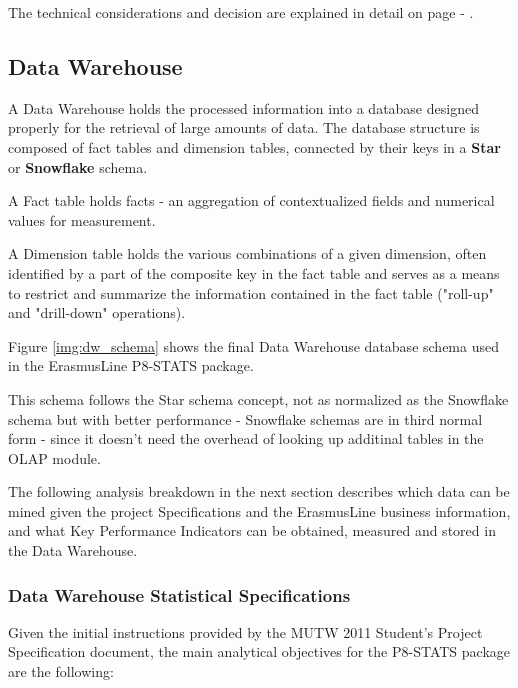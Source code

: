 The technical considerations and decision are explained in detail on page
\pageref{ssec:mysql_merge} - .


\newpage
\subsection{Data Warehouse}

A Data Warehouse holds the processed information into a database designed
properly for the retrieval of large amounts of data. The database structure is
composed of fact tables and dimension tables, connected by their keys in a
\textbf{Star} or \textbf{Snowflake} schema\cite{dwtk}.

A Fact table holds facts - an aggregation of contextualized fields and numerical
values for measurement\cite{dwtk}.

A Dimension table holds the various combinations of a given dimension, often
identified by a part of the composite key in the fact table and serves as a
means to restrict and summarize the information contained in the fact table
("roll-up" and "drill-down" operations)\cite{dwtk}.

Figure \ref{img:dw_schema} shows the final Data Warehouse database schema used
in the ErasmusLine P8-STATS package.

This schema follows the Star schema concept, not as normalized as the Snowflake
schema but with better performance\cite{dwtk} - Snowflake schemas are in third
normal form - since it doesn't need the overhead of looking up additinal tables
in the OLAP module.

The following analysis breakdown in the next section describes which data can be
mined given the project Specifications and the ErasmusLine business information,
and what Key Performance Indicators can be obtained, measured and stored in the
Data Warehouse.

\newpage
{}
\newpage

\subsubsection{Data Warehouse Statistical Specifications}

Given the initial instructions provided by the MUTW 2011 Student's Project
Specification document, the main analytical objectives for the P8-STATS package
are the following:

